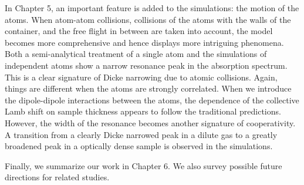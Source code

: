 In Chapter 5, an important feature is added to the simulations: the motion of the atoms. When atom-atom collisions, collisions of the atoms with the walls of the container,  and the free flight in between are taken into account, the model becomes more comprehensive and hence displays more intriguing phenomena. Both a semi-analytical treatment of a single atom and the simulations of independent atoms show a narrow resonance peak in the absorption spectrum. This is a clear signature of Dicke narrowing due to atomic collisions. Again, things are different when the atoms are strongly correlated. When we introduce the dipole-dipole interactions between the atoms, the dependence of the collective Lamb shift on sample thickness appears to follow the traditional predictions. However, the width of the resonance becomes another signature of cooperativity.  A transition from a clearly Dicke narrowed peak in a dilute gas to a greatly broadened peak in a optically dense sample is observed in the simulations.

Finally, we summarize our work in Chapter 6. We also survey possible future directions for related studies.







